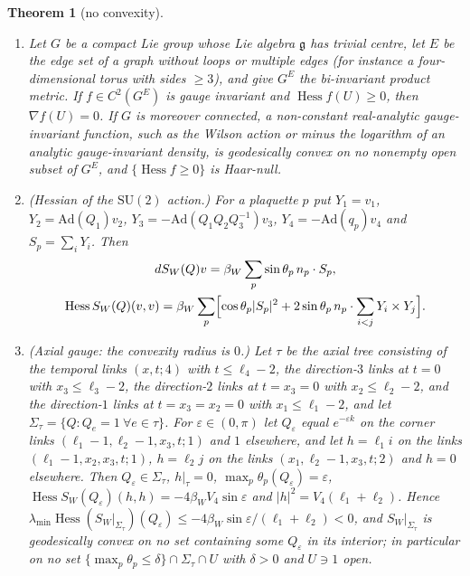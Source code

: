 \documentclass[11pt,a4paper]{amsart}
\newtheorem{theorem}{Theorem}[section]
\theoremstyle{definition}
\theoremstyle{remark}
\numberwithin{equation}{section}
\DeclareMathOperator{\Hess}{Hess}    %
\newcommand{\abs}[1]{\lvert #1\rvert}      %
\newcommand{\SU}{\mathrm{SU}}              %
\newcommand{\betaW}{\beta_{W}}             %
\begin{document}
\begin{theorem}[no convexity]\label{thm:no-convexity}
\begin{enumerate}[label=\textup{(\alph*)},leftmargin=*]
\item Let $G$ be a compact Lie group whose Lie algebra $\mathfrak g$ has trivial centre, let $E$ be the edge set of a graph without loops or multiple edges \textup{(}for instance a four-dimensional torus with sides $\ge3$\textup{)}, and give $G^E$ the bi-invariant product metric. If $f\in C^2(G^E)$ is gauge invariant and $\Hess f(U)\ge0$, then $\nabla f(U)=0$. If $G$ is moreover connected, a non-constant real-analytic gauge-invariant function, such as the Wilson action or minus the logarithm of an analytic gauge-invariant density, is geodesically convex on no nonempty open subset of $G^E$, and $\{\Hess f\ge0\}$ is Haar-null.
\item \textup{(Hessian of the $\SU(2)$ action.)} For a plaquette $p$ put $Y_1=v_1$, $Y_2=\mathrm{Ad}(Q_1)v_2$, $Y_3=-\mathrm{Ad}(Q_1Q_2Q_3^{-1})v_3$, $Y_4=-\mathrm{Ad}(q_p)v_4$ and $S_p=\sum_iY_i$. Then
\[
\begin{gathered}
dS_W(Q)v=\betaW\sum_p\sin\theta_p\,n_p\cdot S_p,\\
\Hess S_W(Q)(v,v)=\betaW\sum_p\Bigl[\cos\theta_p\abs{S_p}^2+2\sin\theta_p\,n_p\cdot\sum_{i<j}Y_i\times Y_j\Bigr].
\end{gathered}
\]
\item \textup{(Axial gauge: the convexity radius is $0$.)} Let $\tau$ be the axial tree consisting of the temporal links $(x,t;4)$ with $t\le\ell_4-2$, the direction-$3$ links at $t=0$ with $x_3\le\ell_3-2$, the direction-$2$ links at $t=x_3=0$ with $x_2\le\ell_2-2$, and the direction-$1$ links at $t=x_3=x_2=0$ with $x_1\le\ell_1-2$, and let $\Sigma_\tau=\{Q:Q_e=1\ \forall e\in\tau\}$. For $\varepsilon\in(0,\pi)$ let $Q_\varepsilon$ equal $e^{-\varepsilon k}$ on the corner links $(\ell_1-1,\ell_2-1,x_3,t;1)$ and $1$ elsewhere, and let $h=\ell_1i$ on the links $(\ell_1-1,x_2,x_3,t;1)$, $h=\ell_2j$ on the links $(x_1,\ell_2-1,x_3,t;2)$ and $h=0$ elsewhere. Then $Q_\varepsilon\in\Sigma_\tau$, $h|_\tau=0$, $\max_p\theta_p(Q_\varepsilon)=\varepsilon$, $\Hess S_W(Q_\varepsilon)(h,h)=-4\betaW V_4\sin\varepsilon$ and $\abs h^2=V_4(\ell_1+\ell_2)$. Hence $\lambda_{\min}\Hess(S_W|_{\Sigma_\tau})(Q_\varepsilon)\le-4\betaW\sin\varepsilon/(\ell_1+\ell_2)<0$, and $S_W|_{\Sigma_\tau}$ is geodesically convex on no set containing some $Q_\varepsilon$ in its interior; in particular on no set $\{\max_p\theta_p\le\delta\}\cap\Sigma_\tau\cap U$ with $\delta>0$ and $U\ni1$ open.

\end{enumerate}
\end{theorem}
\end{document}
